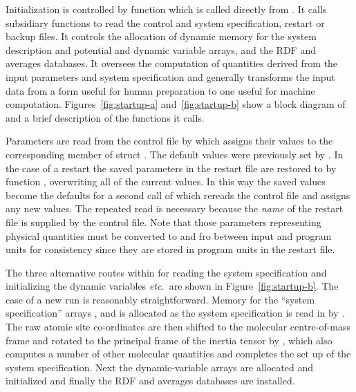 \documentclass[a4paper,twoside]{report}
\newcommand{\etc}{\emph{etc.}}
\begin{document}
Initialization is controlled by function  which is
called directly from . It calls subsidiary functions to
read the control and system specification, restart or backup files.
It controls the allocation of dynamic memory for the system
description and potential and dynamic variable arrays, and the RDF and
averages databases. It oversees the computation of quantities derived
from the input parameters and system specification and generally
transforms the input data from a form useful for human preparation to
one useful for machine computation. Figures~\ref{fig:startup-a}
and~\ref{fig:startup-b} show a block diagram of  and
a brief description of the functions it calls.

Parameters are read from the control file by 
which assigns their values to the corresponding member of struct
.  The default values were previously set by
.  In the case of a restart the saved
parameters in the restart file are restored to  by
function , overwriting all of the current
values.  In this way the saved values become the defaults for a second
call of  which rereads the control file and
assigns any new values.  The repeated read is
necessary because the \emph{name} of the restart file is supplied by
the control file.  Note that those parameters representing physical
quantities must be converted to and fro between input and program
units for consistency since they are stored in program units in the
restart file.

The three alternative routes within  for reading the
system specification and initializing the dynamic variables \etc\ are
shown in Figure~\ref{fig:startup-b}.  The case of a new run is
reasonably straightforward.  Memory for the ``system specification''
arrays ,  and  is
allocated as the system specification is read in by
.  The raw atomic site co-ordinates are then
shifted to the molecular centre-of-mass frame and rotated to the
principal frame of the inertia tensor by ,
which also computes a number of other molecular quantities and
completes the set up of the system specification. Next the
dynamic-variable arrays are allocated and initialized and finally the
RDF and averages databases are installed.
\end{document}

